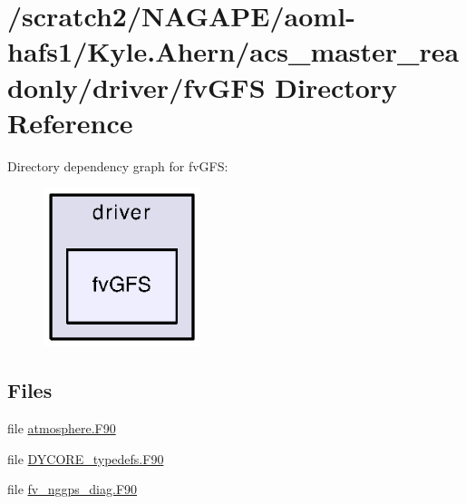 \section{/scratch2/\-N\-A\-G\-A\-P\-E/aoml-\/hafs1/\-Kyle.Ahern/acs\-\_\-master\-\_\-readonly/driver/fv\-G\-F\-S Directory Reference}
\label{dir_ef13d85282fd0ff3db59aa5e99d2bcaa}
Directory dependency graph for fv\-G\-F\-S\-:
\nopagebreak
\begin{figure}[H]
\begin{center}
\leavevmode
\includegraphics[width=130pt]{dir_ef13d85282fd0ff3db59aa5e99d2bcaa_dep}
\end{center}
\end{figure}
\subsection*{Files}
\begin{DoxyCompactItemize}
\item 
file \hyperlink{atmosphere_8F90}{atmosphere.\-F90}
\item 
file \hyperlink{DYCORE__typedefs_8F90}{D\-Y\-C\-O\-R\-E\-\_\-typedefs.\-F90}
\item 
file \hyperlink{fv__nggps__diag_8F90}{fv\-\_\-nggps\-\_\-diag.\-F90}
\end{DoxyCompactItemize}

